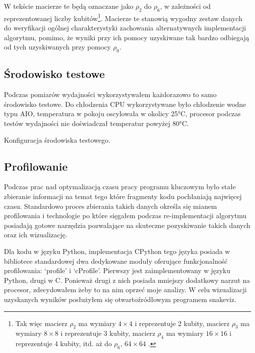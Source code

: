\documentclass[11pt, a4paper]{article}
\begin{document}
\begin{sloppypar}
    \FloatBarrier

    W tekście macierze te będą oznaczane jako $\rho_{2}$ do $\rho_{6}$, w zależności od
    reprezentowanej liczby kubitów\footnote{Tak więc macierz $\rho_{2}$ ma wymiary $4\times
    4$ i reprezentuje 2 kubity, macierz $\rho_{3}$ ma wymiary $8\times8$ i reprezentuje
    3 kubity, macierz $\rho_{4}$ ma wymiary $16\times16$ i reprezentuje 4 kubity, itd. aż
    do $\rho_{6}$, $64\times64$ .}. Macierze te stanowią wygodny zestaw danych do
    weryfikacji ogólnej charakterystyki zachowania alternatywnych implementacji
    algorytmu, pomimo, że wyniki przy ich pomocy uzyskiwane tak bardzo odbiegają od tych
    uzyskiwanych przy pomocy $\rho_{0}$.

    \newpage


    \subsection{Środowisko testowe}


    Podczas pomiarów wydajności wykorzystywałem każdorazowo to samo środowisko testowe. Do
    chłodzenia CPU wykorzystywane było chłodzenie wodne typu AIO, temperatura w pokoju
    oscylowała w okolicy 25°C, procesor podczas testów wydajności nie doświadczał temperatur
    powyżej 80°C.

    \FloatBarrier
    \begin{table}[ht]
      \centering
      
      \caption{Konfiguracja środowiska testowego.}
      \label{pc-configuration}
    \end{table}
    \FloatBarrier

    \subsection{Profilowanie}


    Podczas prac nad optymalizacją czasu pracy programu kluczowym było stałe zbieranie
    informacji na temat tego które fragmenty kodu pochłaniają najwięcej czasu. Standardowo
    proces zbierania takich danych określa się mianem profilowania i technologie po które
    sięgałem podczas re-implementacji algorytmu posiadają gotowe narzędzia pozwalające na
    skuteczne pozyskiwanie takich danych oraz ich wizualizację.

    Dla kodu w języku Python, implementacja CPython tego języka posiada w bibliotece
    standardowej dwa dedykowane moduły oferujące funkcjonalność profilowania: `profile' i
    `cProfile'. Pierwszy jest zaimplementowany w języku Python, drugi w C. Ponieważ
    drugi z nich posiada mniejszy dodatkowy narzut na procesor, zdecydowałem żeby to na nim
    oprzeć moje analizy. W celu wizualizacji uzyskanych wyników posłużyłem się
    otwartoźródłowym programem snakeviz\cite{Snakeviz_PyPI}.


\end{sloppypar}
\end{document}
